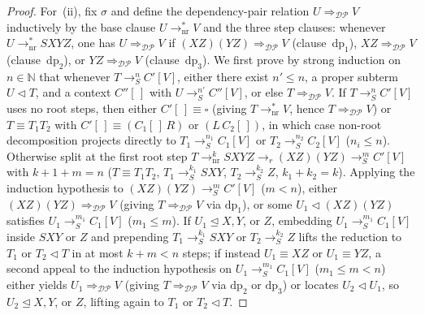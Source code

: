 \documentclass[11pt,reqno]{amsart}
\numberwithin{equation}{section}
\theoremstyle{plain}
\theoremstyle{definition}
\theoremstyle{remark}
\newcommand{\redS}{\to_S}
\begin{document}
\begin{proof}
For~(ii), fix $\sigma$ and define the dependency-pair relation $U \Rightarrow_{\mathcal{DP}} V$ inductively by the base clause $U \to_{\mathrm{nr}}^* V$ and the three step clauses: whenever $U \to_{\mathrm{nr}}^* S X Y Z$, one has $U \Rightarrow_{\mathcal{DP}} V$ if $(X Z)(Y Z) \Rightarrow_{\mathcal{DP}} V$ (clause~$\mathrm{dp}_1$), $X Z \Rightarrow_{\mathcal{DP}} V$ (clause~$\mathrm{dp}_2$), or $Y Z \Rightarrow_{\mathcal{DP}} V$ (clause~$\mathrm{dp}_3$). We first prove by strong induction on $n \in \mathbb{N}$ that whenever $T \redS^n C'[V]$, either there exist $n' \le n$, a proper subterm $U \triangleleft T$, and a context $C''[\,]$ with $U \redS^{n'} C''[V]$, or else $T \Rightarrow_{\mathcal{DP}} V$. If $T \redS^n C'[V]$ uses no root steps, then either $C'[\,] \equiv \square$ (giving $T \to_{\mathrm{nr}}^* V$, hence $T \Rightarrow_{\mathcal{DP}} V$) or $T \equiv T_1 T_2$ with $C'[\,] \equiv (C_1[\,]\,R)$ or $(L\,C_2[\,])$, in which case non-root decomposition projects directly to $T_1 \redS^{n_1} C_1[V]$ or $T_2 \redS^{n_2} C_2[V]$ ($n_i \le n$). Otherwise split at the first root step $T \to_{\mathrm{nr}}^k S X Y Z \to_r (X Z)(Y Z) \redS^m C'[V]$ with $k + 1 + m = n$ ($T \equiv T_1 T_2$, $T_1 \redS^{k_1} S X Y$, $T_2 \redS^{k_2} Z$, $k_1 + k_2 = k$). Applying the induction hypothesis to $(X Z)(Y Z) \redS^m C'[V]$ ($m < n$), either $(X Z)(Y Z) \Rightarrow_{\mathcal{DP}} V$ (giving $T \Rightarrow_{\mathcal{DP}} V$ via $\mathrm{dp}_1$), or some $U_1 \triangleleft (X Z)(Y Z)$ satisfies $U_1 \redS^{m_1} C_1[V]$ ($m_1 \le m$). If $U_1 \trianglelefteq X, Y$, or $Z$, embedding $U_1 \redS^{m_1} C_1[V]$ inside $S X Y$ or $Z$ and prepending $T_1 \redS^{k_1} S X Y$ or $T_2 \redS^{k_2} Z$ lifts the reduction to $T_1$ or $T_2 \triangleleft T$ in at most $k + m < n$ steps; if instead $U_1 \equiv X Z$ or $U_1 \equiv Y Z$, a second appeal to the induction hypothesis on $U_1 \redS^{m_1} C_1[V]$ ($m_1 \le m < n$) either yields $U_1 \Rightarrow_{\mathcal{DP}} V$ (giving $T \Rightarrow_{\mathcal{DP}} V$ via $\mathrm{dp}_2$ or $\mathrm{dp}_3$) or locates $U_2 \triangleleft U_1$, so $U_2 \trianglelefteq X, Y$, or $Z$, lifting again to $T_1$ or $T_2 \triangleleft T$.


\end{proof}
\end{document}
